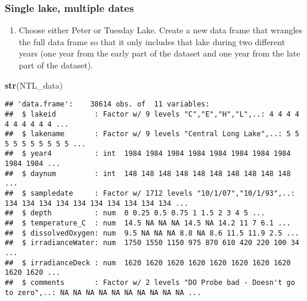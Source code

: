 \documentclass[]{article}
\newenvironment{Shaded}{\begin{snugshade}}{\end{snugshade}}
\newcommand{\KeywordTok}[1]{\textcolor[rgb]{0.13,0.29,0.53}{\textbf{#1}}}
\newcommand{\NormalTok}[1]{#1}
\newcommand{\OperatorTok}[1]{\textcolor[rgb]{0.81,0.36,0.00}{\textbf{#1}}}
\newcommand{\StringTok}[1]{\textcolor[rgb]{0.31,0.60,0.02}{#1}}
\providecommand{\tightlist}{%
  \setlength{\itemsep}{0pt}\setlength{\parskip}{0pt}}
\begin{document}
\hypertarget{single-lake-multiple-dates}{%
\subsubsection{Single lake, multiple
dates}\label{single-lake-multiple-dates}}

\begin{enumerate}
\def\labelenumi{\arabic{enumi}.}
\setcounter{enumi}{4}
\tightlist
\item
  Choose either Peter or Tuesday Lake. Create a new data frame that
  wrangles the full data frame so that it only includes that lake during
  two different years (one year from the early part of the dataset and
  one year from the late part of the dataset).
\end{enumerate}

\begin{Shaded}
\begin{Highlighting}[]
\KeywordTok{str}\NormalTok{(NTL_data)}
\end{Highlighting}
\end{Shaded}

\begin{verbatim}
## 'data.frame':    38614 obs. of  11 variables:
##  $ lakeid         : Factor w/ 9 levels "C","E","H","L",..: 4 4 4 4 4 4 4 4 4 4 ...
##  $ lakename       : Factor w/ 9 levels "Central Long Lake",..: 5 5 5 5 5 5 5 5 5 5 ...
##  $ year4          : int  1984 1984 1984 1984 1984 1984 1984 1984 1984 1984 ...
##  $ daynum         : int  148 148 148 148 148 148 148 148 148 148 ...
##  $ sampledate     : Factor w/ 1712 levels "10/1/07","10/1/93",..: 134 134 134 134 134 134 134 134 134 134 ...
##  $ depth          : num  0 0.25 0.5 0.75 1 1.5 2 3 4 5 ...
##  $ temperature_C  : num  14.5 NA NA NA 14.5 NA 14.2 11 7 6.1 ...
##  $ dissolvedOxygen: num  9.5 NA NA NA 8.8 NA 8.6 11.5 11.9 2.5 ...
##  $ irradianceWater: num  1750 1550 1150 975 870 610 420 220 100 34 ...
##  $ irradianceDeck : num  1620 1620 1620 1620 1620 1620 1620 1620 1620 1620 ...
##  $ comments       : Factor w/ 2 levels "DO Probe bad - Doesn't go to zero",..: NA NA NA NA NA NA NA NA NA NA ...
\end{verbatim}

\begin{Shaded}
\end{Shaded}
\end{document}
